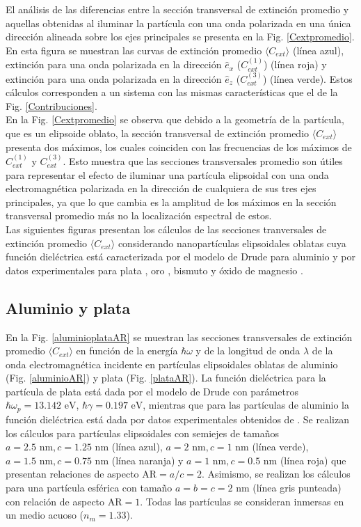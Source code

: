 El análisis de las diferencias entre la sección transversal de extinción promedio y aquellas obtenidas al iluminar la partícula con una onda polarizada en una única dirección alineada sobre los ejes principales se presenta en la Fig. \ref{Cextpromedio}. En esta figura se muestran las curvas de extinción promedio $\langle C_{ext}\rangle$ (línea azul), extinción para una onda polarizada en la dirección $\hat{e}_x$ ($C_{ext}^{(1)}$) (línea roja) y extinción para una onda polarizada en la dirección $\hat{e}_z$ ($C_{ext}^{(3)}$) (línea verde). Estos cálculos corresponden a un sistema con las mismas características que el de la Fig. \ref{Contribuciones}.\\

En la Fig. \ref{Cextpromedio} se observa que debido a la geometría de la partícula, que es un elipsoide oblato, la sección transversal de extinción promedio 
$\langle C_{ext}\rangle$ presenta dos máximos, los cuales coinciden con las frecuencias de los máximos de $C_{ext}^{(1)}$ y $C_{ext}^{(3)}$. Esto muestra que las secciones transversales promedio son útiles para representar el efecto de iluminar una partícula elipsoidal con una onda electromagnética polarizada en la dirección de cualquiera de sus tres ejes principales, ya que lo que cambia es la amplitud de los máximos en la sección transversal promedio más no la localización espectral de estos. \\

Las siguientes figuras presentan los cálculos de las secciones tranversales de extinción promedio  $\langle C_{ext}\rangle$ considerando nanopartículas elipsoidales oblatas cuya función dieléctrica está caracterizada por el modelo de Drude para aluminio \cite{Aluminio} y por datos experimentales para plata \cite{Plata}, oro \cite{Plata}, bismuto \cite{Bismuto} y  óxido de magnesio \cite{MgO}.


\subsection*{Aluminio y plata}
En la Fig. \ref{aluminioplataAR} se muestran las secciones transversales de extinción promedio $\langle C_{ext}\rangle$ en función de la energía $\hbar\omega$ y de la longitud de onda $\lambda$  de la onda electromagnética incidente en partículas elipsoidales oblatas de aluminio (Fig. \ref{aluminioAR}) y plata (Fig. \ref{plataAR}). La función dieléctrica para la partícula de plata está dada por el modelo de Drude con parámetros $\hbar\omega_p=13.142\text{ eV}$, $\hbar\gamma=0.197\text{ eV}$, mientras que para las partículas de aluminio la función dieléctrica está dada por datos experimentales obtenidos de \cite{Plata}. Se realizan los cálculos para partículas elipsoidales con semiejes de tamaños $a=2.5 \text{ nm}, c=1.25 \text{ nm}$ (línea azul), $a=2 \text{ nm}, c=1 \text{ nm}$ (línea verde), $a=1.5 \text{ nm}, c=0.75 \text{ nm}$ (línea naranja) y $a=1 \text{ nm}, c=0.5 \text{ nm}$ (línea roja) que presentan relaciones de aspecto  AR$=a/c=2$. Asimismo, se realizan los cálculos para una partícula esférica con tamaño $a=b=c=2 \text{ nm}$ (línea gris punteada) con relación de aspecto AR$=1$. Todas las partículas se consideran inmersas en un medio acuoso ($n_m=1.33$).\\

